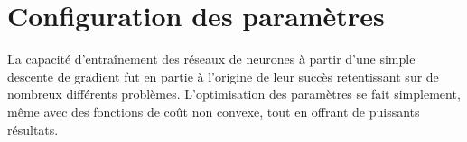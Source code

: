 \section{Configuration des paramètres}
\label{subsec:initialisation-parametres}

La capacité d'entraînement des réseaux de neurones à partir d'une simple descente de gradient fut en partie à l'origine de leur succès retentissant sur de nombreux différents problèmes. L'optimisation des paramètres se fait simplement, même avec des fonctions de coût non convexe, tout en offrant de puissants résultats.

